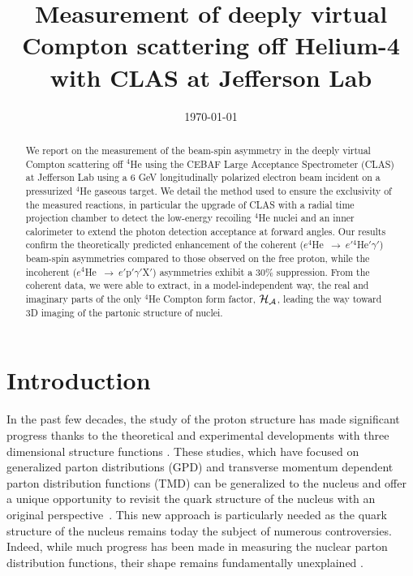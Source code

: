\documentclass{article}
\begin{document}
\title{Measurement of deeply virtual Compton scattering off Helium-4 with CLAS at Jefferson Lab}

%

\date{\today}
\maketitle
\linenumbers

\begin{abstract}
We report on the measurement of the beam-spin asymmetry in the deeply virtual Compton 
scattering off $^4$He using the CEBAF Large Acceptance Spectrometer (CLAS) at
Jefferson Lab using a 6 GeV longitudinally polarized electron beam incident on a 
pressurized $^4$He gaseous target. We detail the method used to ensure the exclusivity 
of the measured reactions, in particular the upgrade of CLAS with a radial time 
projection chamber to detect the 
low-energy recoiling $^4$He nuclei and an inner calorimeter to extend the 
photon detection acceptance at forward angles. Our results confirm the 
theoretically predicted enhancement of the coherent 
($e^4$He~$\to~e'$$^4$He$'\gamma'$) beam-spin asymmetries compared to those 
observed on the free proton, while the incoherent 
($e^4$He~$\to~e'$p$'\gamma'$X$'$) asymmetries exhibit a 30$\%$ suppression.  
From the coherent data, we were able to extract, in a model-independent way, 
the real and imaginary parts of the only $^4$He Compton form factor, $\cal 
H_A$, leading the way toward 3D imaging of the partonic structure of nuclei.
\end{abstract}



\section{Introduction}

In the past few decades, the study of the proton structure has made significant progress
thanks to the theoretical and experimental developments with three dimensional 
structure functions \cite{Anselmino:2015uka}. These studies, which have focused on generalized
parton distributions (GPD) and transverse momentum dependent parton distribution functions (TMD)
can be generalized to the nucleus and offer a unique opportunity to revisit the quark structure 
of the nucleus with an original perspective~\cite{Dupre:2015jha}. This new approach is 
particularly needed as the quark structure of the nucleus remains today the subject of numerous
controversies. Indeed, while much progress has been made in measuring the nuclear
parton distribution functions, their shape remains fundamentally 
unexplained \cite{Norton:2003cb,Malace:2014uea,Hen:2016kwk}.
\end{document}

